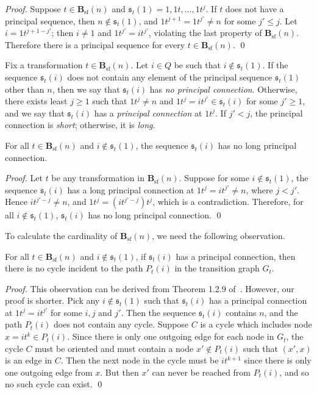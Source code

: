 \documentclass{llncs}
\renewcommand{\le}{\leqslant}
\renewcommand{\ge}{\geqslant}
\newcommand{\seq}{{\mathfrak{s}}}
\newcommand{\tpath}{P}
\newcommand{\Bsf}{\mathbf{B}_{\mathrm{sf}}}
\begin{document}
\begin{proof} 
Suppose $t \in \Bsf(n)$ and $\seq_t(1) = 1,1t,\ldots,1t^j$. 
If $t$ does not have a principal sequence, 
then $n \not\in \seq_t(1)$, and $1t^{j+1} = 1t^{j'} \neq n$ for some $j' \le j$.
Let $i=1t^{j+1-j'}$; then $i \neq 1$ and $1t^{j'} =it^{j'}$, violating the last property of $\Bsf(n)$.
Therefore there is a principal sequence for every $t \in \Bsf(n)$. \qed
\end{proof}

Fix a transformation $t \in \Bsf(n)$. Let $i \in Q$ be such that $i \not\in \seq_t(1)$. If the sequence $\seq_t(i)$ does not contain any element of the principal sequence $\seq_t(1)$ other than $n$, then we say that $\seq_t(i)$ has {\em no principal connection}. Otherwise, there exists least $j \ge 1$ such that $1t^j \neq n$ and $1t^j = it^{j'} \in \seq_t(i)$ for some $j' \ge 1$, and we say that $\seq_t(i)$ has a {\em principal connection} at $1t^j$. If $j' < j$, the  principal connection is {\em short}; otherwise, it is {\em long}. 

\begin{lemma}\label{lem:shortpath} 
For all $t \in \Bsf(n)$ and $i \not\in \seq_t(1)$, the sequence $\seq_t(i)$ has no long principal connection.
\end{lemma}

\begin{proof} 
Let $t$ be any transformation in $\Bsf(n)$. Suppose for some $i \not\in \seq_t(1)$, the sequence $\seq_t(i)$ has a long principal connection at $1t^j = it^{j'} \neq n$, where $j < j'$. Hence $it^{j'-j} \neq n$, and $1t^j = (it^{j'-j})t^j$, which is a contradiction. Therefore, for all $i \not\in \seq_t(1)$, $\seq_t(i)$ has no long principal connection. \qed
\end{proof}


To calculate the cardinality of $\Bsf(n)$, we need the following observation. 
\begin{lemma}\label{lem:ptree} 

For all $t \in \Bsf(n)$ and $i \not\in \seq_t(1)$, if $\seq_t(i)$ has a principal connection, then there is no cycle incident to the path $\tpath_t(i)$ in the transition graph $G_t$. 

\end{lemma}

\begin{proof} 
This observation can be derived from Theorem 1.2.9 of~\cite{GaMa09}. However, our proof is shorter. 
Pick any $i \not\in \seq_t(1)$ such that $\seq_t(i)$ has a principal connection at $1t^j = it^{j'}$ for some $i,j$ and $j'$. Then the sequence $\seq_t(i)$ contains $n$, and the path $\tpath_t(i)$ does not contain any cycle. Suppose $C$ is a cycle which includes node 
$x=it^k \in \tpath_t(i)$. 
Since there is only one outgoing edge for each node in $G_t$, the cycle $C$ must be oriented and must contain a node $x'\not\in \tpath_t(i)$ such that $(x',x)$ is an edge in $C$.
Then the next node in the cycle must be $it^{k+1}$ since there is only one outgoing edge from $x$. But then  $x'$ can never be reached from $\tpath_t(i)$, and so no such cycle can exist. \qed
\end{proof}
\end{document}
